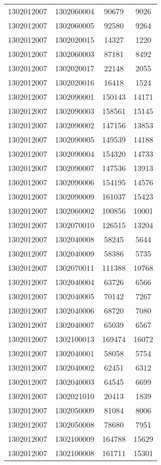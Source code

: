 \begin{longtable}[h]{llcc}
		1302012007 & 1302060004 & 90679 & 9026\\
		1302012007 & 1302060005 & 92580 & 9264\\
		1302012007 & 1302020015 & 14327 & 1220\\
		1302012007 & 1302060003 & 87181 & 8492\\
		1302012007 & 1302020017 & 22148 & 2055\\
		1302012007 & 1302020016 & 16418 & 1524\\
		1302012007 & 1302090001 & 150143 & 14171\\
		1302012007 & 1302090003 & 158561 & 15145\\
		1302012007 & 1302090002 & 147156 & 13853\\
		1302012007 & 1302090005 & 149539 & 14188\\
		1302012007 & 1302090004 & 154320 & 14733\\
		1302012007 & 1302090007 & 147536 & 13913\\
		1302012007 & 1302090006 & 154195 & 14576\\
		1302012007 & 1302090009 & 161037 & 15423\\
		1302012007 & 1302060002 & 100856 & 10001\\
		1302012007 & 1302070010 & 126515 & 13204\\
		1302012007 & 1302040008 & 58245 & 5644\\
		1302012007 & 1302040009 & 58386 & 5735\\
		1302012007 & 1302070011 & 111388 & 10768\\
		1302012007 & 1302040004 & 63726 & 6566\\
		1302012007 & 1302040005 & 70142 & 7267\\
		1302012007 & 1302040006 & 68720 & 7080\\
		1302012007 & 1302040007 & 65039 & 6567\\
		1302012007 & 1302100013 & 169474 & 16072\\
		1302012007 & 1302040001 & 58058 & 5754\\
		1302012007 & 1302040002 & 62451 & 6312\\
		1302012007 & 1302040003 & 64545 & 6699\\
		1302012007 & 1302021010 & 20413 & 1839\\
		1302012007 & 1302050009 & 81084 & 8006\\
		1302012007 & 1302050008 & 78680 & 7951\\
		1302012007 & 1302100009 & 164788 & 15629\\
		1302012007 & 1302100008 & 161711 & 15301\\

\end{longtable}
